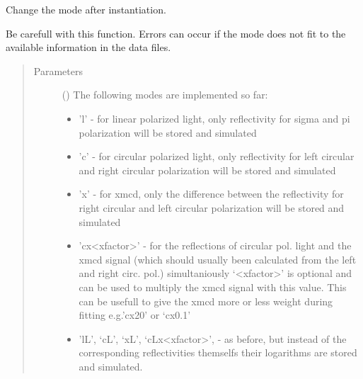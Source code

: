 \documentclass[letterpaper,10pt,english]{sphinxmanual}
\begin{document}
\begin{fulllineitems}
\begin{fulllineitems}
\begin{quote}
\begin{description}
\end{description}\end{quote}

\end{fulllineitems}


\begin{fulllineitems}
\label{\detokenize{modules-api/experiment:Experiment.ReflDataSimulator.setMode}}
Change the mode after instantiation.

Be carefull with this function. Errors can occur if the mode does not fit to the available information in the data files.
\begin{quote}\begin{description}
\item[{Parameters}] \leavevmode
{} () \textendash{} 
The following modes are implemented so far:
\begin{itemize}
\item {} 
’l’             - for linear polarized light, only reflectivity for sigma and pi polarization will be stored and simulated

\item {} 
’c’             - for circular polarized light, only reflectivity for left circular and right circular polarization will be stored and simulated

\item {} 
’x’             - for xmcd, only the difference between the reflectivity for right circular and left circular polarization will be stored and simulated

\item {} 
’cx\textless{}xfactor\textgreater{}’   - for the reflections of circular pol. light and the xmcd signal (which should usually been calculated from the left and right circ. pol.) simultaniously ‘\textless{}xfactor\textgreater{}’ is optional and can be used to multiply the xmcd signal with this value. This can be usefull to give the xmcd more or less weight during fitting e.g.’cx20’ or ‘cx0.1’

\item {} 
’lL’, ‘cL’, ‘xL’, ‘cLx\textless{}xfactor\textgreater{}’, - as before, but instead of the corresponding reflectivities themselfs their logarithms are stored and simulated.


\end{itemize}
\end{description}
\end{quote}
\end{fulllineitems}
\end{fulllineitems}
\end{document}
